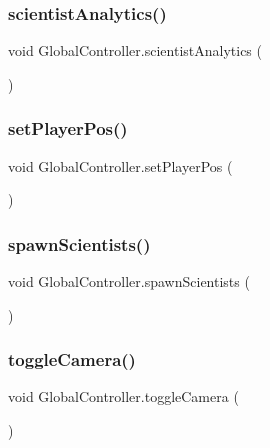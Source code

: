 \subsubsection{\texorpdfstring{scientist\+Analytics()}{scientistAnalytics()}}
{\footnotesize\ttfamily void Global\+Controller.\+scientist\+Analytics (\begin{DoxyParamCaption}{ }\end{DoxyParamCaption})}

\mbox{\label{class_global_controller_a3424caeaad35cc27c958d453ac7586fc}} 
\subsubsection{\texorpdfstring{set\+Player\+Pos()}{setPlayerPos()}}
{\footnotesize\ttfamily void Global\+Controller.\+set\+Player\+Pos (\begin{DoxyParamCaption}{ }\end{DoxyParamCaption})}

\mbox{\label{class_global_controller_a557ce172d6b9580858646f53c354cfcb}} 
\subsubsection{\texorpdfstring{spawn\+Scientists()}{spawnScientists()}}
{\footnotesize\ttfamily void Global\+Controller.\+spawn\+Scientists (\begin{DoxyParamCaption}{ }\end{DoxyParamCaption})}

\mbox{\label{class_global_controller_af4ff92ac33a69fb09fd302cd775b9e96}} 
\subsubsection{\texorpdfstring{toggle\+Camera()}{toggleCamera()}}
{\footnotesize\ttfamily void Global\+Controller.\+toggle\+Camera (\begin{DoxyParamCaption}{ }\end{DoxyParamCaption})}



